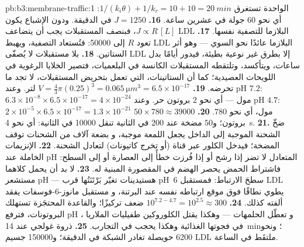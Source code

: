 \begin{solution}{pb:b3:membrane-traffic:1}
الواحدة تستغرق $1/(k_{i}\theta) + 1/k_{r} = 10 + 10 = \qty{20}{min}$:
أي نحو $60$ جولة في عشرين ساعة.
\textbf{16.} $J = 1250$ في الدقيقة. ودون الإشباع يكون $J \propto R\,[L]$،
فبنصف المستقبلات يجب أن يتضاعف LDL البلازما للتصفية نفسها.
\textbf{17.} تعود $R$ إلى \num{50000}: فتُستعاد التصفية، ويهبط LDL البلازما
عائدًا نحو السوي --- وهو أثر الستاتين.
\textbf{18.} بلا مستقبلات لا يُصفّى LDL إلا بطرق
غير نوعية بطيئة، فيدور أيامًا بدل ساعات، ويتأكسد،
وتلتقطه المستقبلات الكانسة في البلعميات،
فتصير الخلايا الرغوية في اللويحات العصيدية؛ كما أن الستاتينات،
التي تعمل بتحريض المستقبلات، لا تجد ما تحرضه.
\textbf{19.} $V = \tfrac{4}{3}\pi(0.25)^{3} = \qty{0.065}{\micro m^3} =
6.5\times 10^{-17}$ لتر. وعند pH $7.2$: $6.3\times 10^{-8}\times 6.5\times
10^{-17} = 4\times 10^{-24}$ مول --- أي نحو $2$ بروتون حر. وعند pH $4.7$:
$2\times 10^{-5}\times 6.5\times 10^{-17} = 1.3\times 10^{-21}$ مول،
أي نحو $780$.
\textbf{20.} $50\times 780 \approx \num{39000}$ بروتون؛ و$50$ مضخة عند
$200$ في الثانية تنقل \num{10000} في الثانية: أي نحو \qty{4}{s}.
\textbf{21.} ضخّ الشحنة الموجبة إلى الداخل يجعل اللمعة موجبة، و
بضعة آلاف من الشحنات توقف المضخة؛ فيدخل الكلور عبر
قناة (أو تخرج كاتيونات) لتعادل الشحنة.
\textbf{22.} الإنزيمات الخاملة عند pH المتعادل لا تضر إذا رشح 
أو إذا فُرزت خطأً إلى العصارة أو إلى السطح: فاشتراط الحمض
يحصر الهضم في المقصورة المبنية له.
\textbf{23.} لا بد أن يحمل كلاهما مستشعر pH --- هستيدينات
تغيّر بَرْتَنَتُها قرب pH~6 سطحَ الارتباط: فمستقبل LDL
يطوي نطاقًا فوق موقع ارتباطه نفسه عند البرتنة، و
مستقبل مانوز-6-فوسفات يفقد ألفته كذلك.
\textbf{24.} $10^{7.2 - 4.7} = 10^{2.5} \approx 300$ ضعف تركيزًا؛
والقاعدة المحتجَزة تستهلك البروتونات، فترفع pH ، و
تعطّل الحلمهات --- وهكذا يقتل الكلوروكين طفيليات الملاريا
في فجوتها الغذائية وهكذا يحجب  في التجارب.
\textbf{25.} ذروة غولجي عند \qty{14}{min}؛ ونحو \num{6200} حويصلة تغادر
الشبكة في الدقيقة؛ و\num{150000} جسيم LDL ملتقَط في
الساعة.
\end{solution}
